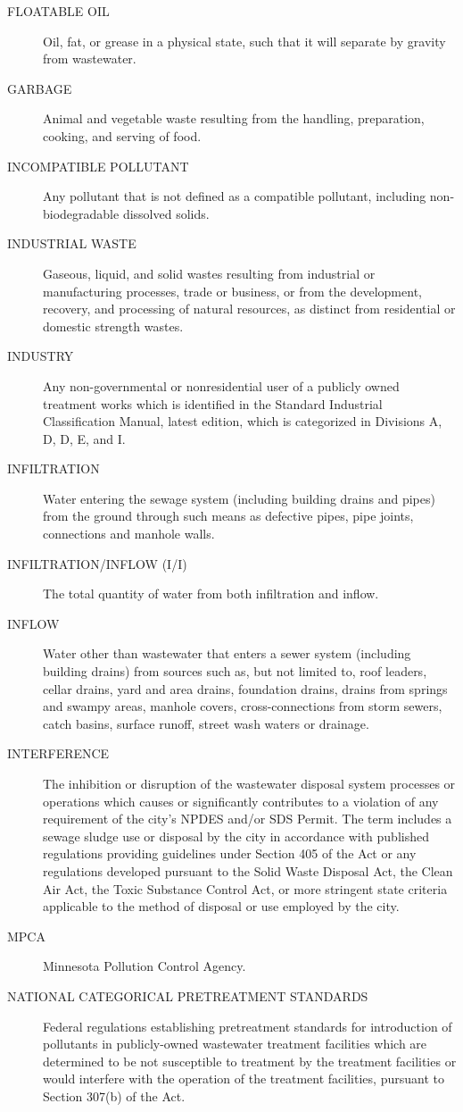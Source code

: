 \documentclass[code.tex]{subfiles}
\begin{document}
\begin{description}
\item[FLOATABLE OIL] Oil, fat, or grease in a physical state, such that it will separate by gravity from wastewater.
\item[GARBAGE] Animal and vegetable waste resulting from the handling, preparation, cooking, and serving of food.
\item[INCOMPATIBLE POLLUTANT] Any pollutant that is not defined as a compatible pollutant, including non-biodegradable dissolved solids.
\item[INDUSTRIAL WASTE] Gaseous, liquid, and solid wastes resulting from industrial or manufacturing processes, trade or business, or from the development, recovery, and processing of natural resources, as distinct from residential or domestic strength wastes.
\item[INDUSTRY] Any non-governmental or nonresidential user of a publicly owned treatment works which is identified in the Standard Industrial Classification Manual, latest edition, which is categorized in Divisions A, D, D, E, and I.
\item[INFILTRATION] Water entering the sewage system (including building drains and pipes) from the ground through such means as defective pipes, pipe joints, connections and manhole walls.
\item[INFILTRATION/INFLOW (I/I)] The total quantity of water from both infiltration and inflow.
\item[INFLOW] Water other than wastewater that enters a sewer system (including building drains) from sources such as, but not limited to, roof leaders, cellar drains, yard and area drains, foundation drains, drains from springs and swampy areas, manhole covers, cross-connections from storm sewers, catch basins, surface runoff, street wash waters or drainage.
\item[INTERFERENCE] The inhibition or disruption of the wastewater disposal system processes or operations which causes or significantly contributes to a violation of any requirement of the city’s NPDES and/or SDS Permit. The term includes a sewage sludge use or disposal by the city in accordance with published regulations providing guidelines under Section 405 of the Act or any regulations developed pursuant to the Solid Waste Disposal Act, the Clean Air Act, the Toxic Substance Control Act, or more stringent state criteria applicable to the method of disposal or use employed by the city.
\item[MPCA] Minnesota Pollution Control Agency.
\item[NATIONAL CATEGORICAL PRETREATMENT STANDARDS] Federal regulations establishing pretreatment standards for introduction of pollutants in publicly-owned wastewater treatment facilities which are determined to be not susceptible to treatment by the treatment facilities or would interfere with the operation of the treatment facilities, pursuant to Section 307(b) of the Act.

\end{description}
\end{document}
